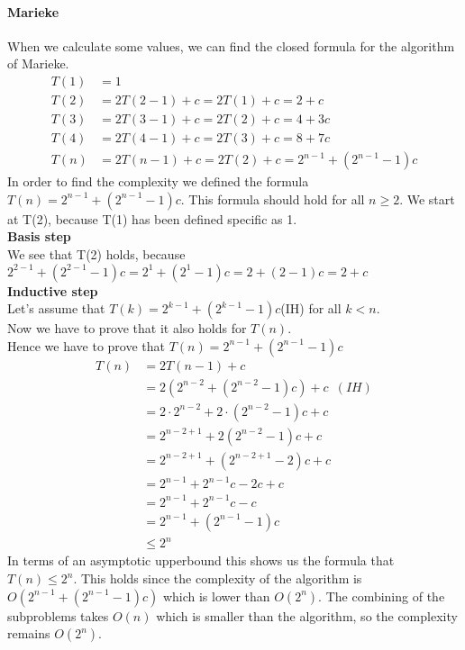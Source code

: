 \documentclass{article}
\begin{document}
\begin{enumerate}
\paragraph{Marieke} When we calculate some values, we can find the closed formula for the algorithm of Marieke.
\begin{align*}
  T(1) &= 1 \\
  T(2) &= 2T(2 - 1) + c = 2T(1) + c = 2 + c \\
  T(3) &= 2T(3 - 1) + c = 2T(2) + c = 4 + 3c \\
  T(4) &= 2T(4 - 1) + c = 2T(3) + c = 8 + 7c \\
  T(n) &= 2T(n - 1) + c = 2T(2) + c = 2^{n-1} + (2^{n-1}-1)c
\end{align*}
In order to find the complexity we defined the formula $T(n) = 2^{n-1} + (2^{n-1}-1)c$. This formula should hold for all $n \geq 2$. We start at T(2), because T(1) has been defined specific as 1. \\
\textbf{Basis step} \\
We see that T(2) holds, because $2^{2-1} + (2^{2-1}-1)c = 2^{1} + (2^{1}-1)c = 2 + (2 - 1)c = 2 + c$ \\
\textbf{Inductive step} \\
  Let's assume that $T(k) = 2^{k-1} + (2^{k-1}-1)c$(IH) for all $k < n$. \\
  Now we have to prove that it also holds for $T(n)$. \\
  Hence we have to prove that $T(n) = 2^{n-1} + (2^{n-1}-1)c$
  \begin{align*}
    T(n) &= 2T(n - 1) + c \\
    &= 2(2^{n-2} + (2^{n-2}-1)c) + c \enspace (IH)\\
    &= 2 \cdot 2^{n-2} + 2 \cdot (2^{n-2}-1)c + c \\
    &= 2^{n-2+1} +  2(2^{n-2}-1)c + c \\
    &= 2^{n-2+1} +  (2^{n-2+1}-2)c + c \\
    &= 2^{n-1} +  2^{n-1}c -2c + c \\
    &= 2^{n-1} +  2^{n-1}c - c \\
    &= 2^{n-1} +  (2^{n-1}-1)c \\
    &\leq 2^n
  \end{align*}
  In terms of an asymptotic upperbound this shows us the formula that $T(n) \leq 2^n$.
This holds since the complexity of the algorithm is $O(2^{n-1} + (2^{n-1}-1)c)$ which is lower than $O(2^{n})$. The combining of the subproblems takes $O(n)$ which is smaller than the algorithm, so the complexity remains $O(2^{n})$.
\newline


\end{enumerate}
\end{document}
